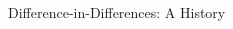 \documentclass[10pt,xcolor=table,ignorenonframetext,handout,aspectratio=169]{beamer}
\begin{document}

\begin{frame}[plain]

\begin{adjustwidth}{0cm}{-4cm}
	
	\begin{center}
		
		\Large{Difference-in-Differences:  A History}
		
	\end{center}
	
\end{adjustwidth}
\end{frame}


\end{document}
